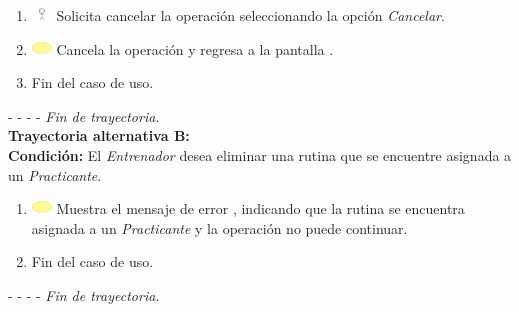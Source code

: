 \begin{enumerate}
	\item \includegraphics[width=15pt, height=10pt]{./Figuras/iconosCU/usuario.png} Solicita cancelar la operación seleccionando la opción \textit{Cancelar}.
	\item \includegraphics[width=15pt]{./Figuras/iconosCU/herramienta.png} Cancela la operación y regresa a la pantalla .
	\item Fin del caso de uso.
\end{enumerate}

- - - - \textit{Fin de trayectoria.} \\

\textbf{\large{Trayectoria alternativa B:}}\\
\textbf{Condición: } El \textit{Entrenador} desea eliminar una rutina que se encuentre asignada a un \textit{Practicante}.

\begin{enumerate}
	\item \includegraphics[width=15pt]{./Figuras/iconosCU/herramienta.png} Muestra el mensaje de error , indicando que la rutina se encuentra asignada a un \textit{Practicante} y la operación no puede continuar.
	\item Fin del caso de uso.
\end{enumerate}
- - - - \textit{Fin de trayectoria.} \\

\clearpage